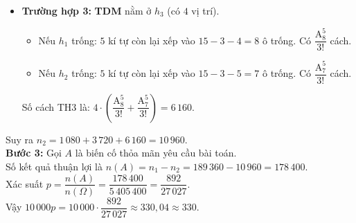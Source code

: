\begin{ex}
{\begin{itemize}
\begin{itemize}
				\item Nếu $h_3$ trống: $5$ kí tự còn lại xếp vào $15 - 3 - 6 = 6$ ô trống. Có $\dfrac{\mathrm{A}_6^5}{3!}$ cách.
			\end{itemize}
			Số cách TH2 là: $3 \cdot \left(\dfrac{\mathrm{A}_8^5}{3!} + \dfrac{\mathrm{A}_6^5}{3!}\right) = 3\,720$.
			\item \textbf{Trường hợp 3:} \textbf{TDM} nằm ở $h_3$ (có $4$ vị trí).
			\begin{itemize}
				\item Nếu $h_1$ trống: $5$ kí tự còn lại xếp vào $15 - 3 - 4 = 8$ ô trống. Có $\dfrac{\mathrm{A}_8^5}{3!}$ cách.
				\item Nếu $h_2$ trống: $5$ kí tự còn lại xếp vào $15 - 3 - 5 = 7$ ô trống. Có $\dfrac{\mathrm{A}_7^5}{3!}$ cách.
			\end{itemize}
			Số cách TH3 là: $4 \cdot \left(\dfrac{\mathrm{A}_8^5}{3!} + \dfrac{\mathrm{A}_7^5}{3!}\right) = 6\,160$.
		\end{itemize}
		Suy ra $n_2 = 1\,080 + 3\,720 + 6\,160 = 10\,960$.\\
		\textbf{Bước 3:} Gọi $A$ là biến cố thỏa mãn yêu cầu bài toán.\\
		Số kết quả thuận lợi là $n(A) = n_1 - n_2 = 189\,360 - 10\,960 = 178\,400$.\\
		Xác suất $p = \dfrac{n(A)}{n(\Omega)} = \dfrac{178\,400}{5\,405\,400} = \dfrac{892}{27\,027}$.\\
		Vậy $10\,000p = 10\,000 \cdot \dfrac{892}{27\,027} \approx 330{,}04 \approx 330$.
	}
\end{ex}
\newpage
{}
\label{B\thedeso}